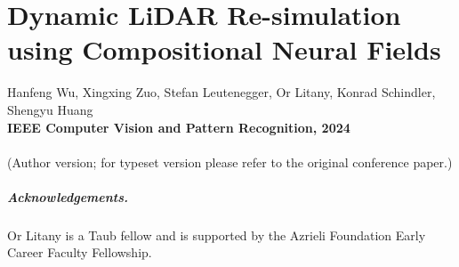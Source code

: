 \chapter[Dynamic LiDAR Re-simulation using Compositional Neural Fields]{Dynamic LiDAR Re-simulation using Compositional Neural Fields}
\label{chap:cvpr24}

Hanfeng Wu, Xingxing Zuo, Stefan Leutenegger, Or Litany, Konrad Schindler, Shengyu Huang \\
\textbf{IEEE Computer Vision and Pattern Recognition, 2024}\\
\\
(Author version; for typeset version please refer to the original conference paper.)\\

\providecommand{\subdir}{.}
\graphicspath{{\subdir/}}


\newpage









\paragraph{Acknowledgements.}
{Or Litany is a Taub fellow and is supported by the Azrieli Foundation Early Career Faculty Fellowship.}


% 
% 
% 